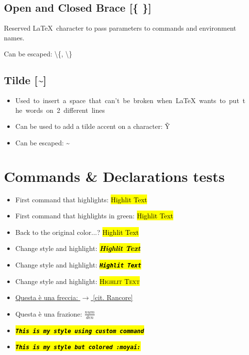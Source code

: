 \documentclass[a4paper]{article}
\newcommand{\mystyle}[1]{\hl{\textit{\textbf{\texttt{#1}}}}}
\newcommand{\mystylecolor}[2]{\sethlcolor{#1} \mystyle{#2}}
\begin{document}
	\subsection{Open and Closed Brace [\{ \}]}
	Reserved \LaTeX\ character to pass parameters to commands and environment names.

	Can be escaped: \textbackslash\{, \textbackslash\}

	\subsection{Tilde [\~{}]}
	\begin{itemize}
		\item Used~to~insert~a~space~that~can't~be~broken~when~\LaTeX~wants~to~put~the~words~on~2~different~lines
		\item Can be used to add a tilde accent on a character: \~{Y}
		\item Can be escaped: \~{}
	\end{itemize}

	\section{Commands \& Declarations tests}
	\begin{itemize}
		\item First command that highlights: \hl{Highlit Text}
		\item First command that highlights in green: { \hl{Highlit Text}}
		\item Back to the original color...? \hl{Highlit Text}
		\item Change style and highlight: \hl{\textit{\textbf{Highlit Text}}}
		\item Change style and highlight: \hl{\textit{\textbf{\texttt{Highlit Text}}}}
		\item Change style and highlight: \hl{\textsc{Highlit Text}}
		\item \href{https://open.spotify.com/track/4AfmZe8i6uNAR5xTSZxqNn?si=aa3887b5fc244fe9}{Questa è una freccia: $\rightarrow$ [cit. Rancore]}
		\item Questa è una frazione: $\frac{num}{den}$
		\item \mystyle{This is my style using custom command}
		\item \mystylecolor{pink}{This is my style but colored :moyai:}
	\end{itemize}

	
\end{document}
